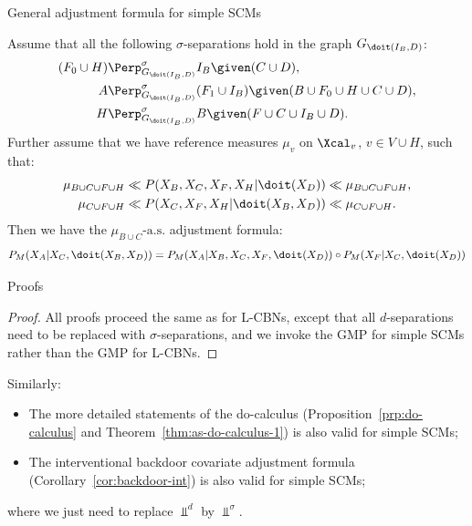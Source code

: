 \begin{frame}{General adjustment formula for simple SCMs}
  \begin{Thm}[\ref{thm:gen-adjustment-scms}]
    \small
Assume that all the following $\sigma$-separations hold in the graph $G_{\doit(I_B,D)}$:
    \begin{align*}
        (F_0 \cup H) & \Perp^\sigma_{G_{\doit(I_B,D)}} I_B \given (C \cup D), \\
        A & \Perp^\sigma_{G_{\doit(I_B,D)}} (F_1 \cup I_B) \given (B \cup F_0 \cup H \cup C \cup D), \\
                      H &\Perp^\sigma_{G_{\doit(I_B,D)}} B \given (F \cup C \cup  I_B \cup D).
    \end{align*}
Further assume that we have reference measures $\mu_v$ on $\Xcal_v$, $v \in V \cup H$, such that:
  \begin{align*}
      \mu_{B \cup C \cup F \cup H} &\ll  P(X_B,X_C,X_F,X_H|\doit(X_D)) \ll \mu_{B \cup C \cup F \cup H},\\
      \mu_{C \cup F \cup H} &\ll  P(X_C,X_F,X_H|\doit(X_B,X_D)) \ll \mu_{C \cup F \cup H}.
  \end{align*}
Then we have the $\mu_{B \cup C}\text{-a.s.}$ adjustment formula:
      \[ P_{M}(X_A|X_C,\doit(X_B,X_D)) = P_{M}(X_A|X_B,X_C,X_F,\doit(X_D)) \circ P_{M}(X_F|X_C,\doit(X_D)) \]
\end{Thm}
\end{frame}

\begin{frame}{Proofs}
  \begin{proof}
    All proofs proceed the same as for L-CBNs, except that all $d$-separations need to be replaced with $\sigma$-separations, and we invoke the GMP for simple SCMs rather than the GMP for L-CBNs.
  \end{proof}

  \bigskip
  Similarly:
  \begin{itemize}
    \item The more detailed statements of the do-calculus (Proposition~\ref{prp:do-calculus} and Theorem~\ref{thm:as-do-calculus-1}) is also valid for simple SCMs;
    \item The interventional backdoor covariate adjustment formula (Corollary~\ref{cor:backdoor-int}) is also valid for simple SCMs;
  \end{itemize}
  where we just need to replace $\Perp^d$ by $\Perp^\sigma$.
\end{frame}



